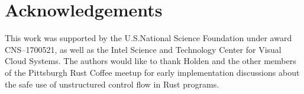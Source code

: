 \section*{Acknowledgements}

This work was supported by the U.S.\@ National Science Foundation under award
CNS--1700521, as well as the Intel Science and Technology Center for Visual Cloud
Systems.  The authors would like to thank Holden and the other members of the
Pittsburgh Rust Coffee meetup for early implementation discussions about the safe use
of unstructured control flow in Rust programs.
